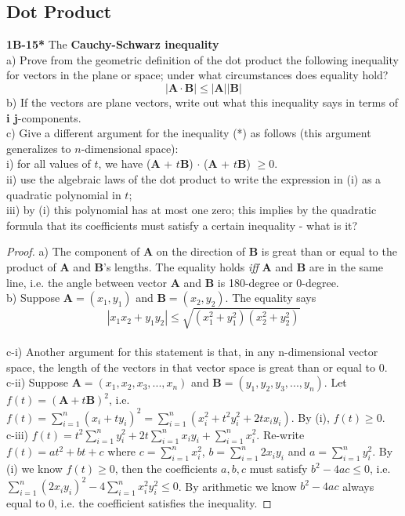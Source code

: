 \documentclass{article}
\begin{document}
\subsection{Dot Product}
%
%
\textbf{1B-15*} The \textbf{Cauchy-Schwarz inequality}
\\ a) Prove from the geometric definition of the dot product the following inequality for vectors in the plane or space; under what circumstances does equality hold?
\begin{equation}
    |\mathbf{A} \cdot \mathbf{B} | \leq |\mathbf{A}||\mathbf{B}|
\end{equation}
b) If the vectors are plane vectors, write out what this inequality says in terms of \textbf{i j}-components.
\\c) Give a different argument for the inequality (*) as follows (this argument generalizes to $n$-dimensional space):
\\i) for all values of $t$, we have (\textbf{A} + $t$\textbf{B}) $\cdot$ (\textbf{A} + $t$\textbf{B}) $\geq 0$.
\\ii) use the algebraic laws of the dot product to write the expression in (i) as a quadratic polynomial in $t$;
\\iii) by (i) this polynomial has at most one zero; this implies by the quadratic formula that its coefficients must satisfy a certain inequality - what is it?
%
%
\begin{proof}
a) The component of \textbf{A} on the direction of \textbf{B} is great than or equal to the product of \textbf{A} and \textbf{B}'s lengths. The equality holds \textit{iff} \textbf{A} and \textbf{B} are in the same line, i.e. the angle between vector \textbf{A} and \textbf{B} is 180-degree or 0-degree.
\\b) Suppose $\mathbf{A} = (x_1, y_1)$ and $\mathbf{B} = (x_2, y_2)$. The equality says
\begin{equation}
    |x_1x_2 + y_1y_2| \leq \sqrt{(x_1^2 + y_1^2)(x_2^2+y_2^2)}
\end{equation}
\\c-i) Another argument for this statement is that, in any n-dimensional vector space, the length of the vectors in that vector space is great than or equal to 0.
\\c-ii) Suppose $\mathbf{A} = (x_1, x_2, x_3, ..., x_n)$ and $\mathbf{B} = (y_1, y_2, y_3, ..., y_n)$. Let $f(t) = (\mathbf{A} + t\mathbf{B})^2$, i.e. $f(t) = \sum_{i=1}^n (x_i + ty_i)^2 = \sum_{i=1}^n ( x_i^2 + t^2y_i^2 + 2tx_iy_i)$. By (i), $f(t) \geq 0$.
\\c-iii) $f(t) = t^2 \sum_{i=1}^ny_i^2 + 2t \sum_{i=1}^n x_iy_i + \sum_{i=1}^n x_i^2$. Re-write $f(t) = at^2 + bt + c$ where $c = \sum_{i=1}^n x_i^2$, $b = \sum_{i=1}^n 2x_iy_i$ and $a = \sum_{i=1}^n y_i^2$. By (i) we know $f(t) \geq 0$, then the coefficients $a,b,c$ must satisfy $b^2 - 4ac \leq 0$, i.e. $\sum_{i=1}^n (2x_iy_i)^2 - 4\sum_{i=1}^n x_i^2y_i^2 \leq 0 $. By arithmetic we know $b^2 - 4ac$ always equal to $0$, i.e. the coefficient satisfies the inequality.
\end{proof}
\end{document}
